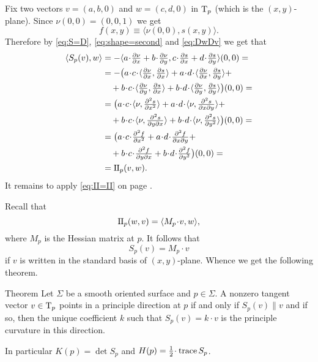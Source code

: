 Fix two vectors $v=(a,b,0)$ and $w=(c,d,0)$ in $\mathrm{T}_p$ (which is the $(x,y)$-plane).
Since $\nu(0,0)=(0,0,1)$ we get 
\[f(x,y)\equiv\langle\nu(0,0),s(x,y)\rangle.\]
Therefore by \ref{eq:S=D}, \ref{eq:shape=second} and \ref{eq:DwDv} we get that 
\begin{align*}
\langle S_p(v),w\rangle 
&=-\langle  a\cdot \tfrac{\partial \nu}{\partial x}+b\cdot \tfrac{\partial \nu}{\partial y},c\cdot \tfrac{\partial s}{\partial x}+d\cdot \tfrac{\partial s}{\partial y}\rangle(0,0)=
\\
&=-\bigl(a\cdot c\cdot\langle \tfrac{\partial \nu}{\partial x},\tfrac{\partial s}{\partial x}\rangle 
+a\cdot d\cdot\langle \tfrac{\partial \nu}{\partial x},\tfrac{\partial s}{\partial y}\rangle+
\\&\quad
+b\cdot c\cdot\langle \tfrac{\partial \nu}{\partial y},\tfrac{\partial s}{\partial x}\rangle
+b\cdot d\cdot\langle \tfrac{\partial \nu}{\partial y},\tfrac{\partial s}{\partial y}\rangle\bigr)(0,0)=
\\
&=\bigl(a\cdot c\cdot\langle \nu,\tfrac{\partial^2 s}{\partial x^2}\rangle 
+a\cdot d\cdot\langle \nu,\tfrac{\partial^2 s}{\partial x\partial y}\rangle+
\\&\quad
+b\cdot c\cdot\langle \nu,\tfrac{\partial^2 s}{\partial y\partial x}\rangle
+b\cdot d\cdot\langle \nu,\tfrac{\partial^2 s}{\partial y^2}\rangle\bigr)(0,0)=
\\
&=\bigl(a\cdot c\cdot\tfrac{\partial^2 f}{\partial x^2} 
+a\cdot d\cdot\tfrac{\partial^2 f}{\partial x\partial y}+
\\&\quad
+b\cdot c\cdot\tfrac{\partial^2 f}{\partial y\partial x}
+b\cdot d\cdot\tfrac{\partial^2 f}{\partial y^2}\bigr)(0,0)=
\\
&=\II_p(v,w).
\end{align*}
It remains to apply \ref{eq:II=II} on page \pageref{eq:II=II}.
\qeds

Recall that 
\[\II_p(w,v)=\langle M_p\cdot v,w\rangle,\]
where $M_p$ is the Hessian matrix at $p$.
It follows that 
\[S_p(v)=M_p\cdot v\]
if $v$ is written in the standard basis of $(x,y)$-plane.
Whence we get the following theorem. 

\begin{thm}{Theorem}\label{thm:rodrigues}
Let $\Sigma$ be a smooth oriented surface and $p\in \Sigma$.
A nonzero tangent vector $v\in \mathrm{T}_p$ points in a principle direction at $p$
if and only if $S_p(v)\parallel v$ and if so, then the unique coefficient $k$ such that
$S_p(v)=k\cdot v$ is the principle curvature in this direction.

In particular $K(p)=\det S_p$ and $H(p)=\tfrac12\cdot \trace S_p $. %
\end{thm}



